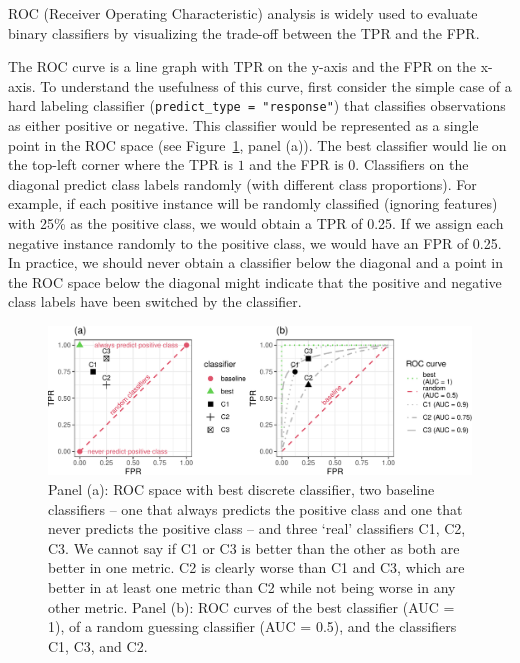 ROC (Receiver Operating Characteristic) analysis is widely
used to evaluate binary classifiers by visualizing the trade-off between
the TPR and the FPR.

The ROC curve is a line graph with TPR on the y-axis and the FPR on the
x-axis. To understand the usefulness of this curve, first consider the
simple case of a hard labeling classifier
(\texttt{predict\_type\ =\ "response"}) that classifies observations as
either positive or negative. This classifier would be represented as a
single point in the ROC space (see Figure~\ref{fig-roc}, panel (a)). The
best classifier would lie on the top-left corner where the TPR is \(1\)
and the FPR is \(0\). Classifiers on the diagonal predict class labels
randomly (with different class proportions). For example, if each
positive instance will be randomly classified (ignoring features) with
25\% as the positive class, we would obtain a TPR of 0.25. If we assign
each negative instance randomly to the positive class, we would have an
FPR of 0.25. In practice, we should never obtain a classifier below the
diagonal and a point in the ROC space below the diagonal might indicate
that the positive and negative class labels have been switched by the
classifier.

\begin{figure}

{\centering \includegraphics[width=1\textwidth,height=\textheight]{chapters/chapter3/evaluation_and_benchmarking_files/figure-pdf/fig-roc-1.pdf}

}

\caption{\label{fig-roc}Panel (a): ROC space with best discrete
classifier, two baseline classifiers -- one that always predicts the
positive class and one that never predicts the positive class -- and
three `real' classifiers C1, C2, C3. We cannot say if C1 or C3 is better
than the other as both are better in one metric. C2 is clearly worse
than C1 and C3, which are better in at least one metric than C2 while
not being worse in any other metric. Panel (b): ROC curves of the best
classifier (AUC = 1), of a random guessing classifier (AUC = 0.5), and
the classifiers C1, C3, and C2.}

\end{figure}

